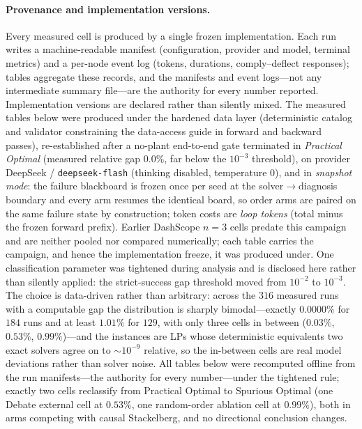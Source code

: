 \documentclass[a4paper,fleqn]{cas-sc}
\begin{document}
\paragraph{Provenance and implementation versions.}
Every measured cell is produced by a single frozen implementation. Each run
writes a machine-readable manifest (configuration, provider and model,
terminal metrics) and a per-node event log (tokens, durations,
comply--deflect responses); tables aggregate these records, and the
manifests and event logs---not any intermediate summary file---are the
authority for every number reported. Implementation versions are declared
rather than silently mixed. The measured tables below were produced under
the hardened data layer (deterministic catalog and validator constraining
the data-access guide in forward and backward passes), re-established
after a no-plant end-to-end gate terminated in \emph{Practical Optimal}
(measured relative gap $0.0\%$, far below the $10^{-3}$ threshold), on
provider DeepSeek /
\texttt{deepseek-flash} (thinking disabled, temperature $0$), and in
\emph{snapshot mode}: the failure blackboard is frozen once per seed at
the solver$\to$diagnosis boundary and every arm resumes the identical
board, so order arms are paired on the same failure state by construction;
token costs are \emph{loop tokens} (total minus the frozen forward
prefix). Earlier DashScope $n{=}3$ cells predate this campaign and are
neither pooled nor compared numerically; each table carries the campaign,
and hence the implementation freeze, it was produced under. One
classification parameter was tightened during analysis and is disclosed
here rather than silently applied: the strict-success gap threshold moved
from $10^{-2}$ to $10^{-3}$. The choice is data-driven rather than
arbitrary: across the $316$ measured runs with a computable gap the
distribution is sharply bimodal---exactly $0.0000\%$ for $184$ runs and at
least $1.01\%$ for $129$, with only three cells in between ($0.03\%$,
$0.53\%$, $0.99\%$)---and the instances are LPs whose deterministic
equivalents two exact solvers agree on to $\sim10^{-9}$ relative, so the
in-between cells are real model deviations rather than solver noise. All
tables below were recomputed offline from the run manifests---the
authority for every number---under the tightened rule; exactly two cells
reclassify from Practical Optimal to Spurious Optimal (one Debate
external cell at $0.53\%$, one random-order ablation cell at $0.99\%$),
both in arms competing with causal Stackelberg, and no directional
conclusion changes.
\end{document}

